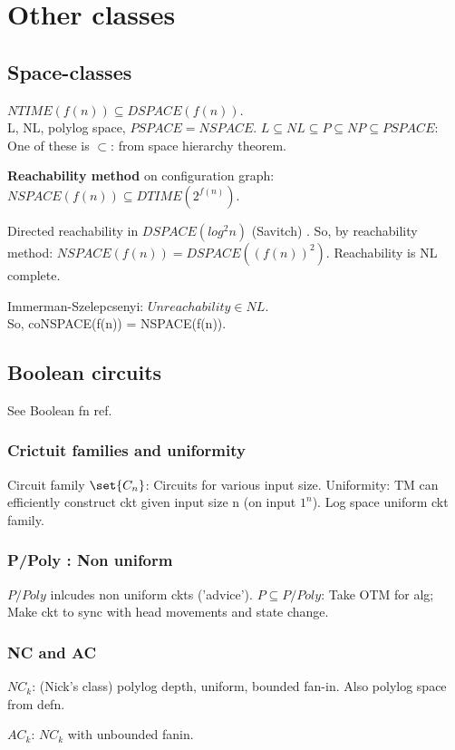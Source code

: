 \documentclass[oneside, article]{memoir}
\begin{document}
\chapter{Other classes}
\section{Space-classes}
$NTIME(f(n)) \subseteq DSPACE(f(n))$.\\
L, NL, polylog space, $PSPACE = NSPACE$. $L \subseteq NL \subseteq P \subseteq NP \subseteq PSPACE$: One of these is $\subset$: from space hierarchy theorem.

\textbf{Reachability method} on configuration graph: \\
$NSPACE(f(n)) \subseteq DTIME(2^{f(n)})$.

Directed reachability in $DSPACE(log^{2} n)$ (Savitch) \chk. So, by reachability method: $NSPACE(f(n)) = DSPACE((f(n))^{2})$. Reachability is NL complete. \why

Immerman-Szelepcsenyi: $Unreachability \in NL$.\\
So, coNSPACE(f(n)) = NSPACE(f(n)).

\section{Boolean circuits}
See Boolean fn ref.

\subsection{Crictuit families and uniformity}
Circuit family $\set{C_{n}}$: Circuits for various input size. Uniformity: TM can efficiently construct ckt given input size n (on input $1^{n}$). Log space uniform ckt family.

\subsection{P/Poly : Non uniform}
$P/Poly$ inlcudes non uniform ckts ('advice'). $P \subseteq P/Poly$: Take OTM for alg; Make ckt to sync with head movements and state change.

\subsection{NC and AC}
$NC_{k}$: (Nick's class) polylog depth, uniform, bounded fan-in. Also polylog space from defn.

$AC_{k}$: $NC_{k}$ with unbounded fanin.
\end{document}
